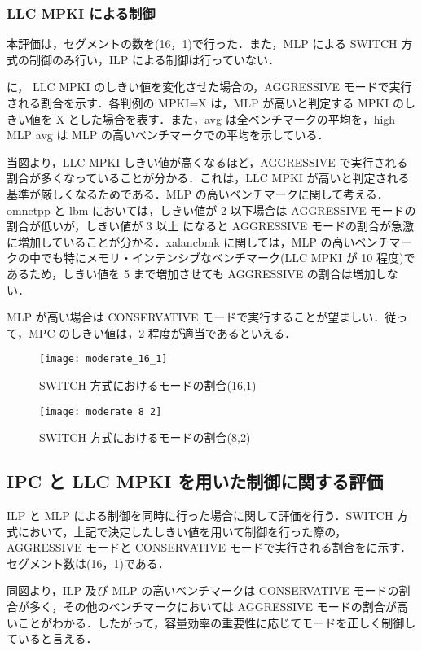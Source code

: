 \subsubsection{LLC MPKI による制御}
本評価は，セグメントの数を(16，1)で行った．また，MLP による SWITCH 方式の制御のみ行い，ILP による制御は行っていない．

に， LLC MPKI のしきい値を変化させた場合の，AGGRESSIVE モードで実行される割合を示す．各判例の MPKI=X は，MLP が高いと判定する MPKI のしきい値を X とした場合を表す．また，avg は全ベンチマークの平均を，high MLP avg は MLP の高いベンチマークでの平均を示している． 

当図より，LLC MPKI しきい値が高くなるほど，AGGRESSIVE で実行される割合が多くなっていることが分かる．これは，LLC MPKI が高いと判定される基準が厳しくなるためである．MLP の高いベンチマークに関して考える．omnetpp と lbm においては，しきい値が 2 以下場合は AGGRESSIVE モードの割合が低いが，しきい値が 3 以上 になると AGGRESSIVE モードの割合が急激に増加していることが分かる．xalancbmk に関しては，MLP の高いベンチマークの中でも特にメモリ・インテンシブなベンチマーク(LLC MPKI が 10 程度)であるため，しきい値を 5 まで増加させても AGGRESSIVE の割合は増加しない．

MLP が高い場合は CONSERVATIVE モードで実行することが望ましい．従って，MPC のしきい値は，2 程度が適当であるといえる．

\begin{figure}[htb]
  \centering
  \texttt{[image: moderate\_16\_1]}
  \caption{SWITCH 方式におけるモードの割合(16,1)}
  \label{fig:moderate_16_1}
\end{figure}

\begin{figure}[htb]
  \centering
  \texttt{[image: moderate\_8\_2]}
  \caption{SWITCH 方式におけるモードの割合(8,2)}
  \label{fig:moderate_16_1}
\end{figure}

\subsection{IPC と LLC MPKI を用いた制御に関する評価}
ILP と MLP による制御を同時に行った場合に関して評価を行う．SWITCH 方式において，上記で決定したしきい値を用いて制御を行った際の，AGGRESSIVE モードと CONSERVATIVE モードで実行される割合をに示す．セグメント数は(16，1)である．

同図より，ILP 及び MLP の高いベンチマークは CONSERVATIVE モードの割合が多く，その他のベンチマークにおいては AGGRESSIVE モードの割合が高いことがわかる．したがって，容量効率の重要性に応じてモードを正しく制御していると言える．


